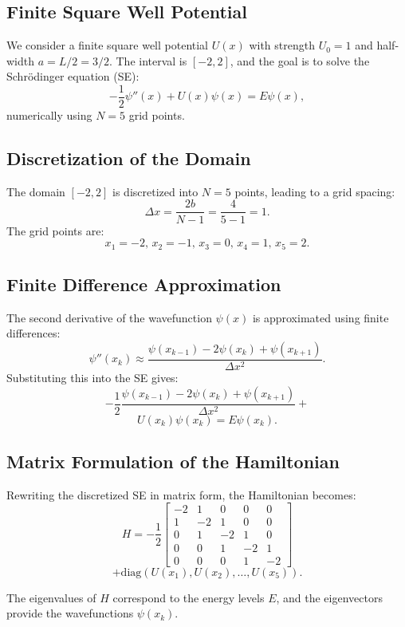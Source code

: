 \documentclass[a4paper,12pt]{article}
\begin{document}
\begin{multicols}{2}
\section{Finite Square Well Potential}
We consider a finite square well potential $U(x)$ with strength $U_0 = 1$ and half-width $a = L/2 = 3/2$. The interval is $[-2, 2]$, and the goal is to solve the Schrödinger equation (SE):
\[
-\frac{1}{2}\psi''(x) + U(x)\psi(x) = E\psi(x),
\]
numerically using $N = 5$ grid points. 

\subsection{Discretization of the Domain}
The domain $[-2, 2]$ is discretized into $N = 5$ points, leading to a grid spacing:
\[
\Delta x = \frac{2b}{N-1} = \frac{4}{5-1} = 1.
\]
The grid points are:
\[
x_1 = -2, \, x_2 = -1, \, x_3 = 0, \, x_4 = 1, \, x_5 = 2.
\]

\subsection{Finite Difference Approximation}
The second derivative of the wavefunction $\psi(x)$ is approximated using finite differences:
\[
\psi''(x_k) \approx \frac{\psi(x_{k-1}) - 2\psi(x_k) + \psi(x_{k+1})}{\Delta x^2}.
\]
Substituting this into the SE gives:
\[
-\frac{1}{2} \frac{\psi(x_{k-1}) - 2\psi(x_k) + \psi(x_{k+1})}{\Delta x^2} + 
\]
\[
U(x_k)\psi(x_k) = E\psi(x_k).
\]

\subsection{Matrix Formulation of the Hamiltonian}
Rewriting the discretized SE in matrix form, the Hamiltonian becomes:
\[
H = -\frac{1}{2}
\begin{bmatrix}
-2 & 1 & 0 & 0 & 0 \\
1 & -2 & 1 & 0 & 0 \\
0 & 1 & -2 & 1 & 0 \\
0 & 0 & 1 & -2 & 1 \\
0 & 0 & 0 & 1 & -2
\end{bmatrix}
\]
\[
+ \text{diag}(U(x_1), U(x_2), \dots, U(x_5)).
\]

The eigenvalues of $H$ correspond to the energy levels $E$, and the eigenvectors provide the wavefunctions $\psi(x_k)$.


\end{multicols}
\end{document}
